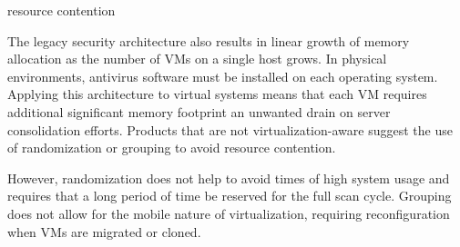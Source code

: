 resource contention 


The legacy security architecture also results in linear growth of memory allocation as the number of VMs on a single host grows. In physical environments, antivirus software must be installed on each operating system. Applying this architecture to virtual systems means that each VM requires additional significant memory footprint  an unwanted drain on server consolidation efforts.
Products that are not virtualization-aware suggest the use of randomization or grouping to avoid resource contention.

However, randomization does not help to avoid times of high system usage and requires that a long period of time be reserved for the full scan cycle. Grouping does not allow for the mobile nature of virtualization, requiring reconfiguration when VMs are migrated or cloned.



